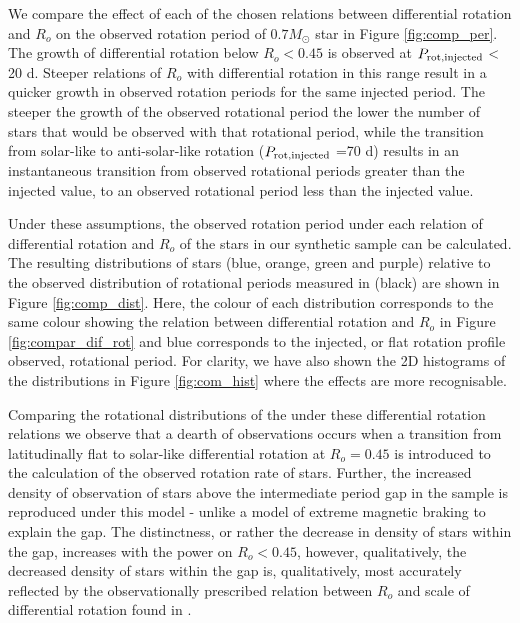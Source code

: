 We compare the effect of each of the chosen relations between differential rotation and $R_o$ on the observed rotation period of $0.7 M_{\odot}$ star in Figure \ref{fig:comp_per}.
The growth of differential rotation below $R_o<0.45$ is observed at $P_{\rm{rot, injected}}$ < 20 d.
Steeper relations of $R_o$ with differential rotation in this range result in a quicker growth in observed rotation periods for the same injected period.
The steeper the growth of the observed rotational period the lower the number of stars that would be observed with that rotational period, while the transition from solar-like to anti-solar-like rotation ($P_{\rm{rot, injected}}$ =70 d) results in an instantaneous transition from observed rotational periods greater than the injected value, to an observed rotational period less than the injected value.

Under these assumptions, the observed rotation period under each relation of differential rotation and $R_o$ of the stars in our synthetic sample can be calculated.
The resulting distributions of stars (blue, orange, green and purple) relative to the observed distribution of \kepler{} rotational periods measured in \citet{mcquillan_rotational_2014} (black) are shown in Figure \ref{fig:comp_dist}.
Here, the colour of each distribution corresponds to the same colour showing the relation between differential rotation and $R_o$ in Figure \ref{fig:compar_dif_rot} and blue corresponds to the injected, or flat rotation profile observed, rotational period.
For clarity, we have also shown the 2D histograms of the distributions in Figure \ref{fig:com_hist} where the effects are more recognisable.

Comparing the rotational distributions of the under these differential rotation relations we observe that a dearth of observations occurs when a transition from latitudinally flat to solar-like differential rotation at $R_o = 0.45$ is introduced to the calculation of the observed rotation rate of stars.
Further, the increased density of observation of stars above the intermediate period gap in the \kepler{} sample is reproduced under this model - unlike a model of extreme magnetic braking to explain the gap.
The distinctness, or rather the decrease in density of stars within the gap, increases with the power on $R_o< 0.45$, however, qualitatively, the decreased density of stars within the gap is, qualitatively, most accurately reflected by the observationally prescribed relation between $R_o$ and scale of differential rotation found in \citet{saar_2011}.

